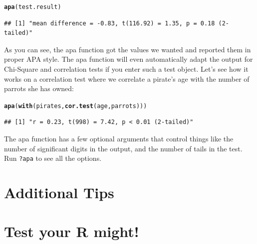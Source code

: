 \documentclass{tufte-book}\usepackage[]{graphicx}\usepackage[]{color}
\makeatletter
\newcommand{\hlstd}[1]{\textcolor[rgb]{0.345,0.345,0.345}{#1}}%
\newcommand{\hlkwd}[1]{\textcolor[rgb]{0.737,0.353,0.396}{\textbf{#1}}}%
\newenvironment{kframe}{%
 \def\at@end@of@kframe{}%
 \ifinner\ifhmode%
  \def\at@end@of@kframe{\end{minipage}}%
  \begin{minipage}{\columnwidth}%
 \fi\fi%
 \def\FrameCommand##1{\hskip\@totalleftmargin \hskip-\fboxsep
 \colorbox{shadecolor}{##1}\hskip-\fboxsep
     \hskip-\linewidth \hskip-\@totalleftmargin \hskip\columnwidth}%
 \MakeFramed {\advance\hsize-\width
   \@totalleftmargin\z@ \linewidth\hsize
   \@setminipage}}%
 {\par\unskip\endMakeFramed%
 \at@end@of@kframe}
\newenvironment{knitrout}{}{} %
\makeatother
\begin{document}
\begin{knitrout}
\color{fgcolor}\begin{kframe}
\begin{alltt}
\hlkwd{apa}\hlstd{(test.result)}
\end{alltt}
\begin{verbatim}
## [1] "mean difference = -0.83, t(116.92) = 1.35, p = 0.18 (2-tailed)"
\end{verbatim}
\end{kframe}
\end{knitrout}

As you can see, the apa function got the values we wanted and reported them in proper APA style. The apa function will even automatically adapt the output for Chi-Square and correlation tests if you enter such a test object. Let's see how it works on a correlation test where we correlate a pirate's age with the number of parrots she has owned:

\begin{knitrout}
\color{fgcolor}\begin{kframe}
\begin{alltt}
\hlkwd{apa}\hlstd{(}\hlkwd{with}\hlstd{(pirates,} \hlkwd{cor.test}\hlstd{(age, parrots)))}
\end{alltt}
\begin{verbatim}
## [1] "r = 0.23, t(998) = 7.42, p < 0.01 (2-tailed)"
\end{verbatim}
\end{kframe}
\end{knitrout}

The apa function has a few optional arguments that control things like the number of significant digits in the output, and the number of tails in the test. Run \texttt{?apa} to see all the options.


\section{Additional Tips}


\section{Test your R might!}
\end{document}
